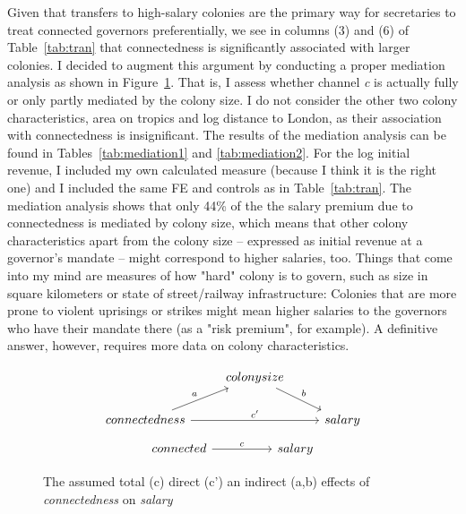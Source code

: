 \documentclass[a4paper]{article}\usepackage[]{graphicx}\usepackage[]{xcolor}
\begin{document}
\hspace*{5mm} Given that transfers to high-salary colonies are the primary way for secretaries to treat connected governors preferentially, we see in columns (3) and (6) of Table~\ref{tab:tran} that connectedness is significantly associated with larger colonies. I decided to augment this argument by conducting a proper mediation analysis as shown in Figure~\ref{triangle}. That is, I assess whether channel \textit{c} is actually fully or only partly mediated by the colony size. I do not consider the other two colony characteristics, area on tropics and log distance to London, as their association with connectedness is insignificant. The results of the mediation analysis can be found in Tables~\ref{tab:mediation1} and \ref{tab:mediation2}. For the log initial revenue, I included my own calculated measure (because I think it is the right one) and I included the same FE and controls as in Table~\ref{tab:tran}. The mediation analysis shows that only 44\% of the the salary premium due to connectedness is mediated by colony size, which means that other colony characteristics apart from the colony size -- expressed as initial revenue at a governor's mandate -- might correspond to higher salaries, too. Things that come into my mind are measures of how "hard" colony is to govern, such as size in square kilometers or state of street/railway infrastructure: Colonies that are more prone to violent uprisings or strikes might mean higher salaries to the governors who have their mandate there (as a "risk premium", for example). A definitive answer, however, requires more data on colony characteristics.    

\begin{figure}[H]
\[
\begin{tikzcd}
 & colony size \arrow[dr,"b"] \\
connectedness \arrow[ur,"a"] \arrow[rr,"c'"] && salary
\end{tikzcd}
\]
\[
\begin{tikzcd}[row sep=2.5em]
connected \arrow[rr,"c"] && salary
\end{tikzcd}
\]
\caption{The assumed total (c) direct (c') an indirect (a,b) effects of \textit{connectedness} on \textit{salary}}
\label{triangle}
\end{figure}
\end{document}
